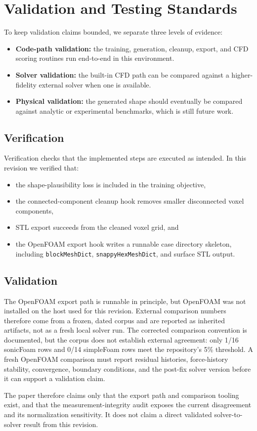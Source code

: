 \section{Validation and Testing Standards}
\label{sec:validation}
To keep validation claims bounded, we separate three levels of evidence:
\begin{itemize}
    \item \textbf{Code-path validation:} the training, generation, cleanup, export, and CFD scoring routines run end-to-end in this environment.
    \item \textbf{Solver validation:} the built-in CFD path can be compared against a higher-fidelity external solver when one is available.
    \item \textbf{Physical validation:} the generated shape should eventually be compared against analytic or experimental benchmarks, which is still future work.
\end{itemize}

\subsection{Verification}
Verification checks that the implemented steps are executed as intended. In this revision we verified that:
\begin{itemize}
    \item the shape-plausibility loss is included in the training objective,
    \item the connected-component cleanup hook removes smaller disconnected voxel components,
    \item STL export succeeds from the cleaned voxel grid, and
    \item the OpenFOAM export hook writes a runnable case directory skeleton, including \texttt{blockMeshDict}, \texttt{snappyHexMeshDict}, and surface STL output.
\end{itemize}

\subsection{Validation}
The OpenFOAM export path is runnable in principle, but OpenFOAM was not installed on the host used for this revision. External comparison numbers therefore come from a frozen, dated corpus and are reported as inherited artifacts, not as a fresh local solver run. The corrected comparison convention is documented, but the corpus does not establish external agreement: only 1/16 sonicFoam rows and 0/14 simpleFoam rows meet the repository's 5\% threshold. A fresh OpenFOAM comparison must report residual histories, force-history stability, convergence, boundary conditions, and the post-fix solver version before it can support a validation claim.

The paper therefore claims only that the export path and comparison tooling exist, and that the measurement-integrity audit exposes the current disagreement and its normalization sensitivity. It does not claim a direct validated solver-to-solver result from this revision.

